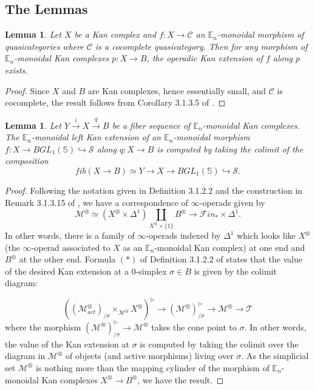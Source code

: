\documentclass{article}
\theoremstyle{definition}
\theoremstyle{plain}
\newtheorem{lem}[rem]{Lemma}
\renewcommand{\S}{\mathcal{S}}
\newcommand{\T}{\mathcal{T}}
\newcommand{\sph}{\mathbb{S}}
\newcommand{\Fin}{\mathcal{F}in_\ast}
\newcommand{\E}{\mathbb{E}}
\begin{document}
\subsection{The Lemmas}\label{lemmas}

\begin{lem}\label{kanextexist}
Let $X$ be a Kan complex and $f\colon X\to \mathcal{C}$ an $\E_n$-monoidal morphism of quasicategories where $\mathcal{C}$ is a cocomplete quasicategory. Then for any morphism of $\E_n$-monoidal Kan complexes $p\colon X\to B$, the operadic Kan extension of $f$ along $p$ exists.
\end{lem}

\begin{proof}
Since $X$ and $B$ are Kan complexes, hence essentially small, and $\mathcal{C}$ is cocomplete, the result follows from Corollary 3.1.3.5 of \cite{ha}. 
\end{proof}

\begin{lem}\label{kanextcomp}
Let $Y\overset{i}\to X\overset{q}\to B$ be a fiber sequence of $\E_n$-monoidal Kan complexes. The $\E_{n}$-monoidal left Kan extension of an $\E_n$-monoidal morphism $f\colon X\to BGL_1(\sph)\hookrightarrow \S$ along $q\colon X\to B$ is computed by taking the colimit of the composition $$fib(X\to B)\simeq Y\to X\to BGL_1(\sph)\hookrightarrow \S.$$
\end{lem}

\begin{proof}
Following the notation given in Definition 3.1.2.2 and the construction in Remark 3.1.3.15 of \cite{ha}, we have a correspondence of $\infty$-operads given by $$\mathcal{M}^\otimes\simeq (X^\otimes\times\Delta^1)\coprod_{X^\otimes\times\{1\}} B^\otimes\to\Fin\times\Delta^1.$$ In other words, there is a family of $\infty$-operads indexed by $\Delta^1$ which looks like $X^\otimes$ (the $\infty$-operad associated to $X$ as an $\E_n$-monoidal Kan complex) at one end and $B^\otimes$ at the other end.  Formula $(\ast)$ of Definition 3.1.2.2 of \cite{ha} states that the value of the desired Kan extension at a 0-simplex $\sigma\in B$ is given by the colimit diagram:

$$ ((\mathcal{M}_{act}^\otimes)_{/\sigma}\times_{\mathcal{M}^\otimes}X^\otimes)^{\triangleright}\to(\mathcal{M}^\otimes)^{\triangleright}_{/\sigma}\to \mathcal{M}^\otimes\to\T$$
 where the morphism $(\mathcal{M}^\otimes)^{\triangleright}_{/\sigma}\to \mathcal{M}^\otimes$ takes the cone point to $\sigma$. In other words, the value of the Kan extension at $\sigma$ is computed by taking the colimit over the diagram in $\mathcal{M}^\otimes$ of objects (and active morphisms) living over $\sigma$. As the simplicial set $\mathcal{M}^\otimes$ is nothing more than the mapping cylinder of the morphism of $\E_n$-monoidal Kan complexes $X^\otimes\to B^\otimes$, we have the result. 
\end{proof}
\end{document}
